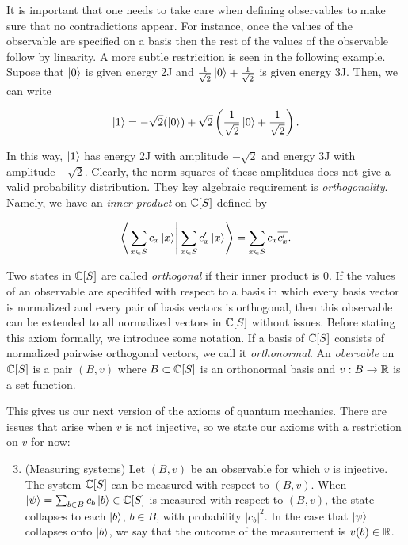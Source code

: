 \documentclass{article}
\theoremstyle{definition}
\numberwithin{figure}{section}
\begin{document}
It is important that one needs to take care when defining observables to make sure that no contradictions appear. For instance, once the values of the observable are specified on a basis then the rest of the values of the observable follow by linearity. A more subtle restricition is seen in the following example. Supose that $\left|0\right>$ is given energy 2J and $\frac{1}{\sqrt{2}}\left|0\right>+\frac{1}{\sqrt{2}}$ is given energy 3J. Then, we can write

$$\left|1\right>=-\sqrt{2}(\left|0\right>)+\sqrt{2}\left(\frac{1}{\sqrt{2}}\left|0\right>+\frac{1}{\sqrt{2}}\right).$$

In this way, $\left|1\right>$ has energy 2J with amplitude $-\sqrt{2}$ and energy 3J with amplitude $+\sqrt{2}$. Clearly, the norm squares of these amplitdues does not give a valid probability distribution. They key algebraic requirement is \textit{orthogonality}. Namely, we have an \textit{inner product} on $\mathbb{C}[S]$ defined by

$$\left<\left.\sum_{x\in S}c_x\ket{x}\right| \sum_{x\in S}c'_x \ket{x}\right>=\sum_{x\in S}c_x\overline{c_x'}.$$

Two states in $\mathbb{C}[S]$ are called \textit{orthogonal} if their inner product is $0$. If the values of an observable are specififed with respect to a basis in which every basis vector is normalized and every pair of basis vectors is orthogonal, then this observable can be extended to all normalized vectors in $\mathbb{C}[S]$ without issues. Before stating this axiom formally, we introduce some notation. If a basis of $\mathbb{C}[S]$ consists of normalized pairwise orthogonal vectors, we call it \textit{orthonormal}. An \textit{obervable} on $\mathbb{C}[S]$ is a pair $(B,v)$ where $B\subset \mathbb{C}[S]$ is an orthonormal basis and $v:B\to \mathbb{R}$ is a set function.

This gives us our next version of the axioms of quantum mechanics. There are issues that arise when $v$ is not injective, so we state our axioms with a restriction on $v$ for now:

\begin{enumerate}[1'.]
\setcounter{enumi}{2}

\item (Measuring systems) Let $(B,v)$ be an observable for which $v$ is injective. The system $\mathbb{C}[S]$ can be measured with respect to $(B,v)$. When $\ket{\psi} = \sum_{b\in B} c_b \ket{b}\in \mathbb{C}[S]$ is measured with respect to $(B,v)$, the state collapses to each $\ket{b}$, $b\in B$, with probability $|c_b|^2$. In the case that $\ket{\psi}$ collapses onto $\ket{b}$, we say that the outcome of the measurement is $v(b)\in \mathbb{R}$.
\end{enumerate}
\end{document}
